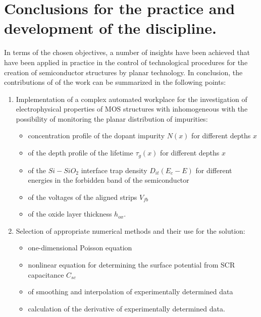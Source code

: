 \chapter{Conclusions for the practice and development of the discipline.}\label{Chapter9}

In terms of the chosen objectives, a number of insights have been
achieved that have been applied in practice in the control of
technological procedures for the creation of semiconductor structures
by planar technology. In conclusion, the contributions of of the work
can be summarized in the following points:

\begin{enumerate}

\item Implementation of a complex automated workplace for the
  investigation of electrophysical properties of MOS structures with
  inhomogeneous with the possibility of monitoring the planar
  distribution of impurities:

  \begin{itemize}
  \item concentration profile of the dopant impurity $N(x)$ for
    different depths $x$
  \item of the depth profile of the lifetime $\tau_{g}(x)$ for
    different depths $x$
  \item of the $Si-SiO_{2}$ interface trap density $D_{it}(E_{c}-E)$
    for different energies in the forbidden band of the semiconductor
  \item of the voltages of the aligned strips $V_{fb}$
  \item of the oxide layer thickness $h_{ox}$.
  \end{itemize}

\item Selection of appropriate numerical methods and their use for the
  solution:

  \begin{itemize}
  \item one-dimensional Poisson equation
  \item nonlinear equation for determining the surface potential from
    SCR capacitance $C_{sc}$
  \item of smoothing and interpolation of experimentally determined data
  \item calculation of the derivative of experimentally determined data.
  \end{itemize}


\end{enumerate}
